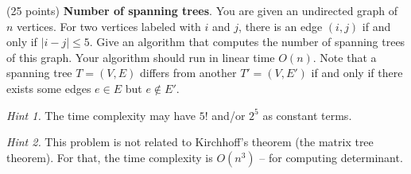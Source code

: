     \item (25 points) \textbf{Number of spanning trees}. You are given an undirected graph of $n$ vertices. For two vertices labeled with $i$ and $j$, there is an edge $(i, j)$ if and only if $\lvert i-j\rvert \leq 5$. Give an algorithm that computes the number of spanning trees of this graph. Your algorithm should run in linear time $O(n)$. Note that a spanning tree $T = (V, E)$ differs from another $T' = (V, E')$ if and only if there exists some edges $e \in E$ but $e \notin E'$.

    \textit{Hint 1.} The time complexity may have $5!$ and/or $2^5$ as constant terms.
    
    \textit{Hint 2.} This problem is not related to Kirchhoff's theorem (the matrix tree theorem). For that, the time complexity is $O(n^3)$ -- for computing determinant. 
